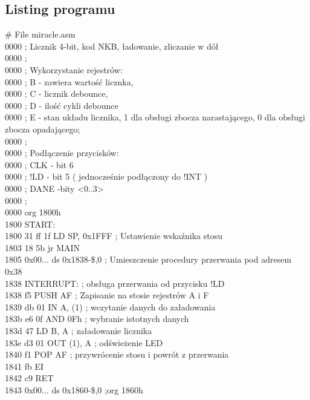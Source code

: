 \documentclass[a4paper,titlepage,11pt,floatssmall]{mwrep}
\begin{document}
\subsection{Listing programu}
\begin{flushleft}
\#  File miracle.asm \\
0000			; Licznik 4-bit, kod NKB, ładowanie, zliczanie w dół\\
0000			; \\
0000			; Wykorzystanie rejestrów:  \\
0000			;	B - zawiera wartość licznka, \\ 
0000			;	C - licznik debounce,  \\
0000			;	D - ilość cykli debounce \\
0000			;	E - stan układu licznika, 1 dla obsługi zbocza narastającego, 0 dla obsługi zbocza opadającego; \\
0000			; \\
0000			; Podłączenie przycisków:  \\
0000			;	CLK - bit 6 \\
0000			;	!LD - bit 5 ( jednocześnie podłączony do !INT )\\ 
0000			;	DANE -bity <0..3> \\
0000			; \\
0000			org 1800h \\
1800			START: \\
1800 31 ff 1f			LD SP, 0x1FFF ; Ustawienie wskaźnika stosu \\
1803 18 5b			jr MAIN  \\
1805 0x00...		ds 0x1838-\$,0 ; Umieszczenie procedury przerwania pod adresem 0x38 \\
1838			INTERRUPT: 		; obsługa przerwania od przycisku !LD \\
1838 f5				PUSH AF 	; Zapisanie na stosie rejestrów A i F \\
1839 db 01			IN A, (1) 	; wczytanie danych do załadowania \\
183b e6 0f			AND 0Fh 	; wybranie istotnych danych \\
183d 47				LD B, A		; załadowanie licznika \\
183e d3 01			OUT (1), A	; odświeżenie LED \\
1840 f1				POP AF		; przywrócenie stosu i powrót z przerwania \\
1841 fb				EI \\
1842 c9				RET \\
1843 0x00...		ds 0x1860-\$,0 ;org 1860h \\

\end{flushleft}
\end{document}
